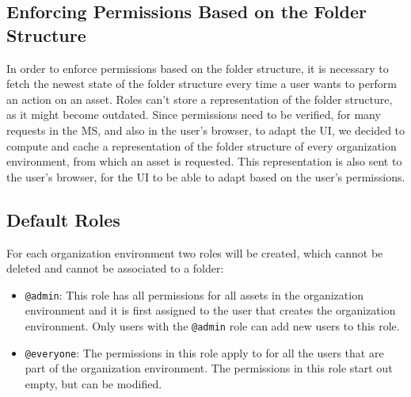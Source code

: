 \subsection{Enforcing Permissions Based on the Folder Structure}

In order to enforce permissions based on the folder structure, it is necessary to fetch
the newest state of the folder structure every time a user wants to perform an action on an asset.
Roles can't store a representation of the folder structure, as it might become outdated.
Since permissions need to be verified, for many requests in the MS, and also in the user's browser, to
adapt the UI, we decided to compute and cache a representation of the folder structure of
every organization environment, from which an asset is requested.
This representation is also sent to the user's browser, for the UI to be able to adapt
based on the user's permissions.


\subsection{Default Roles}

For each organization environment two roles will be created, which cannot be deleted and
cannot be associated to a folder:

\begin{itemize}
	\item \lstinline{@admin}: This role has all permissions for all assets in the
	      organization environment and it is first assigned to the user that creates the organization environment.
	      Only users with the \lstinline{@admin} role can add new users to this role.
	\item \lstinline{@everyone}: The permissions in this role apply to for all the users
	      that are part of the organization environment. The permissions in this role start out
	      empty, but can be modified.
\end{itemize}
